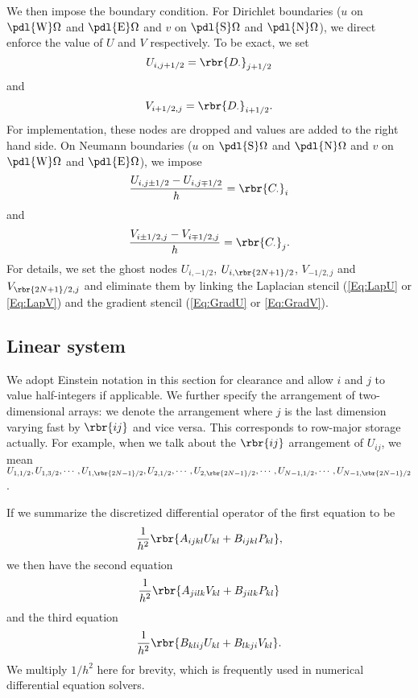 \documentclass[english, nochinese]{pnote}
\begin{document}
We then impose the boundary condition. For Dirichlet boundaries ($u$ on $ \pdl{\text{W}} \Omega $ and $ \pdl{\text{E}} \Omega $ and $v$ on $ \pdl{\text{S}} \Omega $ and $ \pdl{\text{N}} \Omega $), we direct enforce the value of $U$ and $V$ respectively. To be exact, we set
\begin{equation}
U_{ i, j + 1 / 2 } = \rbr{D_{\cdot}}_{ j + 1 / 2 }
\end{equation}
and
\begin{equation}
V_{ i + 1 / 2, j } = \rbr{D_{\cdot}}_{ i + 1 / 2 }.
\end{equation}
For implementation, these nodes are dropped and values are added to the right hand side. On Neumann boundaries ($u$ on $ \pdl{\text{S}} \Omega $ and $ \pdl{\text{N}} \Omega $ and $v$ on $ \pdl{\text{W}} \Omega $ and $ \pdl{\text{E}} \Omega $), we impose
\begin{equation} \label{Eq:GradU}
\frac{ U_{ i, j \pm 1 / 2 } - U_{ i, j \mp 1 / 2 } }{h} = \rbr{C_{\cdot}}_i
\end{equation}
and
\begin{equation} \label{Eq:GradV}
\frac{ V_{ i \pm 1 / 2, j } - V_{ i \mp 1 / 2, j } }{h} = \rbr{C_{\cdot}}_j.
\end{equation}
For details, we set the ghost nodes $ U_{ i, -1 / 2 } $, $ U_{ i, \rbr{ 2 N + 1 } / 2 } $, $ V_{ -1 / 2, j } $ and $ V_{ \rbr{ 2 N + 1 } / 2, j } $ and eliminate them by linking the Laplacian stencil (\eqref{Eq:LapU} or \eqref{Eq:LapV}) and the gradient stencil (\eqref{Eq:GradU} or \eqref{Eq:GradV}).

\subsection{Linear system}

We adopt Einstein notation in this section for clearance and allow $i$ and $j$ to value half-integers if applicable. We further specify the arrangement of two-dimensional arrays: we denote the arrangement where $j$ is the last dimension varying fast by $ \rbr{ i j } $ and vice versa. This corresponds to row-major storage actually. For example, when we talk about the $ \rbr{ i j } $ arrangement of $ U_{ i j } $, we mean $ U_{ 1, 1 / 2 }, U_{ 1, 3 / 2 }, \cdots, U_{ 1, \rbr{ 2 N - 1 } / 2 }, U_{ 2, 1 / 2 }, \cdots, U_{ 2, \rbr{ 2 N - 1 } / 2 }, \cdots, U_{ N - 1, 1 / 2 }, \cdots, U_{ N - 1, \rbr{ 2 N - 1 } / 2 } $.

If we summarize the discretized differential operator of the first equation to be
\begin{equation} \label{Eq:TenA}
\frac{1}{h^2} \rbr{ A_{ i j k l } U_{ k l } + B_{ i j k l } P_{ k l } },
\end{equation}
we then have the second equation
\begin{equation}
\frac{1}{h^2} \rbr{ A_{ j i l k } V_{ k l } + B_{ j i l k } P_{ k l } }
\end{equation}
and the third equation
\begin{equation}
\frac{1}{h^2} \rbr{ B_{ k l i j } U_{ k l } + B_{ l k j i } V_{ k l } }.
\end{equation}
We multiply $ 1 / h^2 $ here for brevity, which is frequently used in numerical differential equation solvers.
\end{document}
